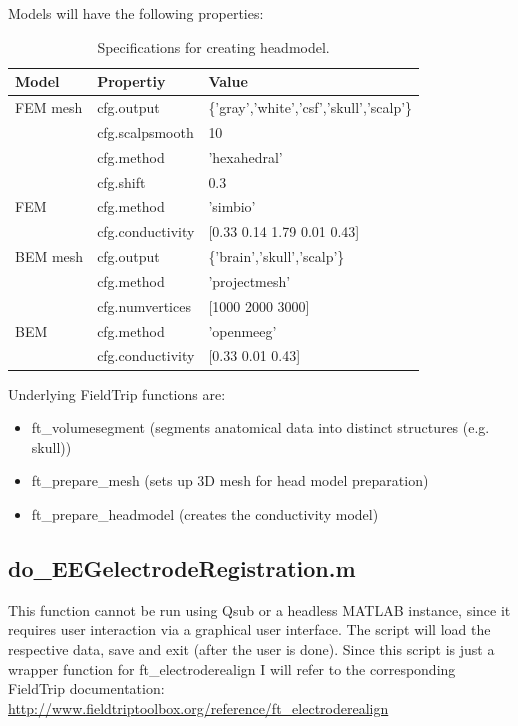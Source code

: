 \documentclass[12pt,a4paper]{scrartcl}
\begin{document}
Models will have the following properties:
\begin{table}[h]
\centering
\begin{tabular}{l | l | l}
\toprule
Model & Propertiy & Value\\\hline
  FEM mesh & cfg.output & \{'gray','white','csf','skull','scalp'\}\\\hline
   & cfg.scalpsmooth & 10\\\hline
   & cfg.method & 'hexahedral'\\\hline
   & cfg.shift & 0.3\\\hline
  FEM & cfg.method & 'simbio'\\\hline
   & cfg.conductivity & [0.33 0.14 1.79 0.01 0.43]\\\midrule
 BEM mesh & cfg.output & \{'brain','skull','scalp'\}\\\hline
  & cfg.method & 'projectmesh'\\\hline
  & cfg.numvertices & [1000 2000 3000]\\\hline
 BEM & cfg.method & 'openmeeg'\\\hline
  & cfg.conductivity & [0.33 0.01 0.43]\\\bottomrule
\end{tabular}
\caption[Specifications for creating headmodel]{Specifications for creating headmodel.}
\label{tab:BEMFEMprop}
\end{table}
Underlying FieldTrip functions are:
\begin{itemize}
\item ft\_volumesegment (segments anatomical data into distinct structures (e.g. skull))
\item ft\_prepare\_mesh (sets up 3D mesh for head model preparation)
\item ft\_prepare\_headmodel (creates the conductivity model)
\end{itemize}

\subsection{do\_EEGelectrodeRegistration.m}
\label{sec:elecReg}
This function cannot be run using Qsub or a headless MATLAB instance, since it requires user interaction via a graphical user interface. The script will load the respective data, save and exit (after the user is done). Since this script is just a wrapper function for ft\_electroderealign I will refer to the corresponding FieldTrip documentation: \href{http://www.fieldtriptoolbox.org/reference/ft\_electroderealign}{http://www.fieldtriptoolbox.org/reference/ft\_electroderealign}
\end{document}
